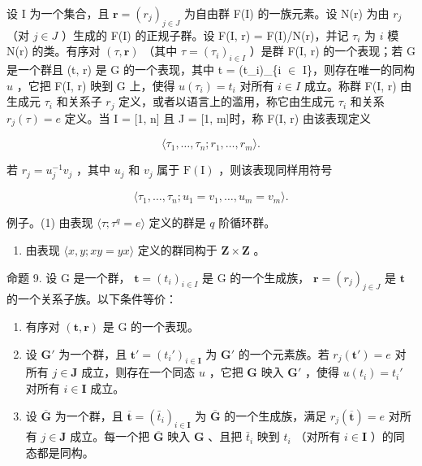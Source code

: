 设 I 为一个集合，且 \(\mathbf{r} = (r_j)_{j \ensuremath{\in} J}\) 为自由群 F(I) 的一族元素。设 N(r) 为由 \(r_j\) （对 \(j \ensuremath{\in} J\) ）生成的 F(I) 的正规子群。设 F(I, r) = F(I)/N(r)，并记 \(\tau_i\) 为 \(i\) 模 N(r) 的类。有序对 \((\tau, \mathbf{r})\) （其中 \(\tau = (\tau_i)_{i \ensuremath{\in} I}\) ）是群 F(I, r) 的一个表现；若 G 是一个群且 (t, r) 是 G 的一个表现，其中 t = (t\_i)\_\{i \ensuremath{\in} I\}，则存在唯一的同构 \(u\) ，它把 F(I, r) 映到 G 上，使得 \(u(\tau_i) = t_i\) 对所有 \(i \ensuremath{\in} I\) 成立。称群 F(I, r) 由生成元 \(\tau_i\) 和关系子 \(r_j\) 定义，或者以语言上的滥用，称它由生成元 \(\tau_i\) 和关系 \(r_j(\tau) = e\) 定义。当 I = {[}1, n{]} 且 J = {[}1, m{]}时，称 F(I, r) 由该表现定义

\[
\langle \tau_ {1}, \dots , \tau_ {n}; r _ {1}, \dots , r _ {m} \rangle .
\]

若 \(r_j = u_j^{-1}v_j\) ，其中 \(u_j\) 和 \(v_j\) 属于 \(\mathrm{F(I)}\) ，则该表现同样用符号

\[
\langle \tau_ {1}, \dots , \tau_ {n}; u _ {1} = v _ {1}, \dots , u _ {m} = v _ {m} \rangle .
\]

例子。(1) 由表现 \(\langle \tau; \tau^q = e \rangle\) 定义的群是 \(q\) 阶循环群。

\begin{enumerate}
\def\labelenumi{(\arabic{enumi})}
\setcounter{enumi}{1}
\tightlist
\item
  由表现 \(\langle x, y; xy = yx \rangle\) 定义的群同构于 \(\mathbf{Z} \times \mathbf{Z}\) 。
\end{enumerate}

命题 9. 设 G 是一个群， \(\mathbf{t} = (t_i)_{i \in I}\) 是 G 的一个生成族， \(\mathbf{r} = (r_j)_{j \in J}\) 是 \(\mathbf{t}\) 的一个关系子族。以下条件等价：

\begin{enumerate}
\def\labelenumi{(\alph{enumi})}
\item
  有序对 \((\mathbf{t},\mathbf{r})\) 是 G 的一个表现。
\item
  设 \(\mathbf{G}'\) 为一个群，且 \(\mathbf{t}' = (t_i')_{i \in \mathbf{I}}\) 为 \(\mathbf{G}'\) 的一个元素族。若 \(r_j(\mathbf{t}') = e\) 对所有 \(j \in \mathbf{J}\) 成立，则存在一个同态 \(u\) ，它把 \(\mathbf{G}\) 映入 \(\mathbf{G}'\) ，使得 \(u(t_i) = t_i'\) 对所有 \(i \in \mathbf{I}\) 成立。
\item
  设 \(\overline{\mathbf{G}}\) 为一个群，且 \(\overline{\mathbf{t}} = (\bar{t}_i)_{i\in \mathbf{I}}\) 为 \(\overline{\mathbf{G}}\) 的一个生成族，满足 \(r_j(\overline{\mathbf{t}}) = e\) 对所有 \(j\in \mathbf{J}\) 成立。每一个把 \(\overline{\mathbf{G}}\) 映入 \(\mathbf{G}\) 、且把 \(\bar{t}_i\) 映到 \(t_i\) （对所有 \(i\in \mathbf{I}\) ）的同态都是同构。
\end{enumerate}


